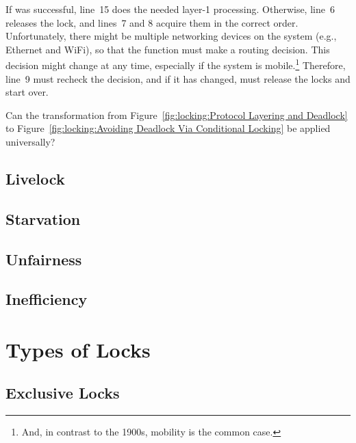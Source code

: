 If  was successful, line~15 does the needed
layer-1 processing.
Otherwise, line~6 releases the lock, and lines~7 and 8 acquire them in
the correct order.
Unfortunately, there might be multiple networking devices on
the system (e.g., Ethernet and WiFi), so that the 
function must make a routing decision.
This decision might change at any time, especially if the system
is mobile.\footnote{
	And, in contrast to the 1900s, mobility is the common case.}
Therefore, line~9 must recheck the decision, and if it has changed,
must release the locks and start over.

\QuickQuiz{}
	Can the transformation from
	Figure~\ref{fig:locking:Protocol Layering and Deadlock} to
	Figure~\ref{fig:locking:Avoiding Deadlock Via Conditional Locking}
	be applied universally?
 \QuickQuizEnd

\subsection{Livelock}
\label{sec:locking:Livelock}

\subsection{Starvation}
\label{sec:locking:Starvation}

\subsection{Unfairness}
\label{sec:locking:Unfairness}

\subsection{Inefficiency}
\label{sec:locking:Inefficiency}

\section{Types of Locks}
\label{sec:locking:Types of Locks}

\subsection{Exclusive Locks}
\label{sec:locking:Exclusive Locks}

